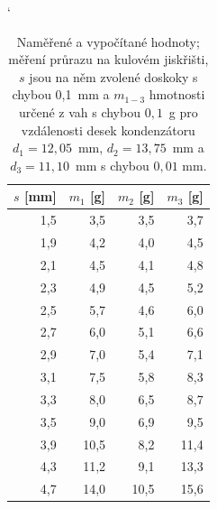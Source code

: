\documentclass[english]{article}
\begin{document}
\begin{table}[h!]
\catcode` %
   \centering
    \begin{tabular}{|r|r|r|r|}
    \hline
    \boldmath{}\textbf{$s$ [mm]}\unboldmath{} & \boldmath{}\textbf{$m_1$ [g]}\unboldmath{} & \boldmath{}\textbf{$m_2$ [g]}\unboldmath{} & \boldmath{}\textbf{$m_3$ [g]}\unboldmath{} \bigstrut\\
    \hline
    1,5   & 3,5   & 3,5   & 3,7 \bigstrut\\
    \hline
    1,9   & 4,2   & 4,0   & 4,5 \bigstrut\\
    \hline
    2,1   & 4,5   & 4,1   & 4,8 \bigstrut\\
    \hline
    2,3   & 4,9   & 4,5   & 5,2 \bigstrut\\
    \hline
    2,5   & 5,7   & 4,6   & 6,0 \bigstrut\\
    \hline
    2,7   & 6,0   & 5,1   & 6,6 \bigstrut\\
    \hline
    2,9   & 7,0   & 5,4   & 7,1 \bigstrut\\
    \hline
    3,1   & 7,5   & 5,8   & 8,3 \bigstrut\\
    \hline
    3,3   & 8,0   & 6,5   & 8,7 \bigstrut\\
    \hline
    3,5   & 9,0   & 6,9   & 9,5 \bigstrut\\
    \hline
    3,9   & 10,5  & 8,2   & 11,4 \bigstrut\\
    \hline
    4,3   & 11,2  & 9,1   & 13,3 \bigstrut\\
    \hline
    4,7   & 14,0  & 10,5  & 15,6 \bigstrut\\
    \hline
    \end{tabular}%
       \caption{
            		Naměřené a vypočítané hodnoty; měření průrazu na kulovém jiskřišti, $s$ jsou na něm zvolené doskoky s chybou 0,1~mm a $m_{1-3}$ hmotnosti určené z vah s chybou $0,1$~g pro vzdálenosti desek kondenzátoru  $d_1=12,05$~mm, $d_2=13,75$~mm a $d_3=11,10$~mm s chybou $0,01$ mm.
            }
  \label{tab:jiskriste}%
\end{table}%
\end{document}
